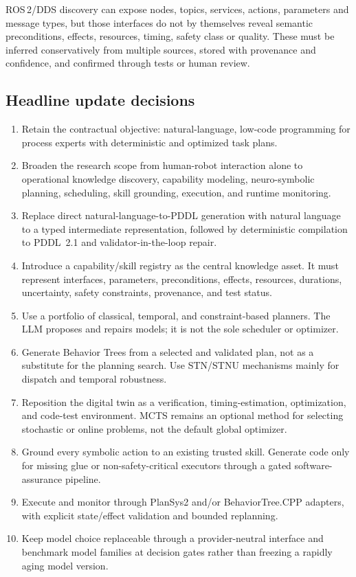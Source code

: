 \documentclass{plan4ari_report}
\begin{document}
ROS\,2/DDS discovery can expose nodes, topics, services, actions, parameters and message types, but those interfaces do not by themselves reveal semantic preconditions, effects, resources, timing, safety class or quality. These must be inferred conservatively from multiple sources, stored with provenance and confidence, and confirmed through tests or human review.

\subsection{Headline update decisions}
\begin{enumerate}
\item Retain the contractual objective: natural-language, low-code programming for process experts with deterministic and optimized task plans.
\item Broaden the research scope from human-robot interaction alone to operational knowledge discovery, capability modeling, neuro-symbolic planning, scheduling, skill grounding, execution, and runtime monitoring.
\item Replace direct natural-language-to-PDDL generation with natural language to a typed intermediate representation, followed by deterministic compilation to PDDL~2.1 and validator-in-the-loop repair.
\item Introduce a capability/skill registry as the central knowledge asset. It must represent interfaces, parameters, preconditions, effects, resources, durations, uncertainty, safety constraints, provenance, and test status.
\item Use a portfolio of classical, temporal, and constraint-based planners. The LLM proposes and repairs models; it is not the sole scheduler or optimizer.
\item Generate Behavior Trees from a selected and validated plan, not as a substitute for the planning search. Use STN/STNU mechanisms mainly for dispatch and temporal robustness.
\item Reposition the digital twin as a verification, timing-estimation, optimization, and code-test environment. MCTS remains an optional method for selecting stochastic or online problems, not the default global optimizer.
\item Ground every symbolic action to an existing trusted skill. Generate code only for missing glue or non-safety-critical executors through a gated software-assurance pipeline.
\item Execute and monitor through PlanSys2 and/or BehaviorTree.CPP adapters, with explicit state/effect validation and bounded replanning.
\item Keep model choice replaceable through a provider-neutral interface and benchmark model families at decision gates rather than freezing a rapidly aging model version.
\end{enumerate}
\end{document}
